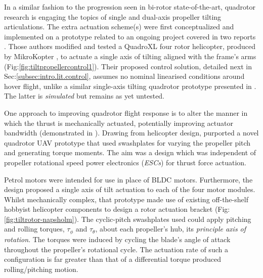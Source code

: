 \par
In a similar fashion to the progression seen in bi-rotor state-of-the-art, quadrotor research is engaging the topics of single and dual-axis propeller tilting articulations. The extra actuation scheme(s) were first conceptualized and implemented on a prototype related to an ongoing project covered in two reports \cite{tiltpropellercontrol,tiltpropellerflight}. Those authors modified and tested a QuadroXL four rotor helicopter, produced by MikroKopter \cite{mikrokopter}, to actuate a single axis of tilting aligned with the frame's arms (Fig:\ref{fig:tiltpropellercontrol1}). Their proposed control solution, detailed next in Sec:\ref{subsec:intro.lit.control}, assumes no nominal linearised conditions around hover flight, unlike a similar single-axis tilting quadrotor prototype presented in \cite{singleaxistilting}. The latter is \emph{simulated} but remains as yet untested.
\par
One approach to improving quadrotor flight response is to alter the manner in which the thrust is mechanically actuated, potentially improving actuator bandwidth (demonstrated in \cite{tiltgasco,tiltrihani}). Drawing from helicopter design, \cite{napsholm} purported a novel quadrotor UAV prototype that used swashplates for varying the propeller pitch and generating torque moments. The aim was a design which was independent of propeller rotational speed power electronics (\emph{ESCs}) for thrust force actuation.
\par
Petrol motors were intended for use in place of BLDC motors. Furthermore, the design proposed a single axis of tilt actuation to each of the four motor modules. Whilst mechanically complex, that prototype made use of existing off-the-shelf hobbyist helicopter components to design a rotor actuation bracket (Fig:\ref{fig:tiltrotor-napsholm}). The cyclic-pitch swashplates \cite{autonomousrobotspitch} used could apply pitching and rolling torques, $\tau_{\phi}$ and $\tau_{\theta}$, about each propeller's hub, its \emph{principle axis of rotation}. The torques were induced by cycling the blade's angle of attack throughout the propeller's rotational cycle. The actuation rate of such a configuration is far greater than that of a differential torque produced rolling/pitching motion.
